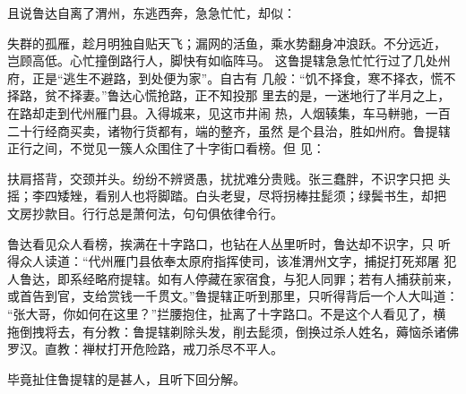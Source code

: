 且说鲁达自离了渭州，东逃西奔，急急忙忙，却似：

失群的孤雁，趁月明独自贴天飞；漏网的活鱼，乘水势翻身冲浪跃。不分远近，
岂顾高低。心忙撞倒路行人，脚快有如临阵马。
这鲁提辖急急忙忙行过了几处州府，正是“逃生不避路，到处便为家”。自古有
几般：“饥不择食，寒不择衣，慌不择路，贫不择妻。”鲁达心慌抢路，正不知投那
里去的是，一迷地行了半月之上，在路却走到代州雁门县。入得城来，见这市井闹
热，人烟辏集，车马軿驰，一百二十行经商买卖，诸物行货都有，端的整齐，虽然
是个县治，胜如州府。鲁提辖正行之间，不觉见一簇人众围住了十字街口看榜。但
见：

扶肩搭背，交颈并头。纷纷不辨贤愚，扰扰难分贵贱。张三蠢胖，不识字只把
头摇；李四矮矬，看别人也将脚踏。白头老叟，尽将拐棒拄髭须；绿鬓书生，却把
文房抄款目。行行总是萧何法，句句俱依律令行。

鲁达看见众人看榜，挨满在十字路口，也钻在人丛里听时，鲁达却不识字，只
听得众人读道：“代州雁门县依奉太原府指挥使司，该准渭州文字，捕捉打死郑屠
犯人鲁达，即系经略府提辖。如有人停藏在家宿食，与犯人同罪；若有人捕获前来，
或首告到官，支给赏钱一千贯文。”鲁提辖正听到那里，只听得背后一个人大叫道：
“张大哥，你如何在这里？”拦腰抱住，扯离了十字路口。不是这个人看见了，横
拖倒拽将去，有分教：鲁提辖剃除头发，削去髭须，倒换过杀人姓名，薅恼杀诸佛
罗汉。直教：禅杖打开危险路，戒刀杀尽不平人。

毕竟扯住鲁提辖的是甚人，且听下回分解。